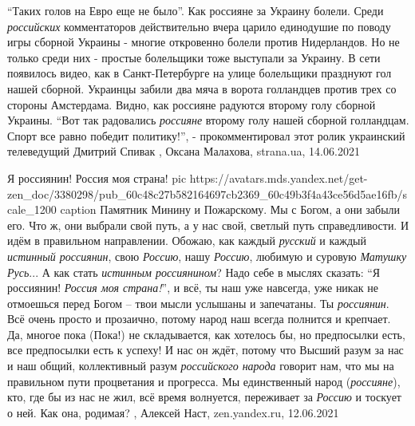 \enquote{Таких голов на Евро еще не было}. Как россияне за Украину болели.
Среди \emph{российских} комментаторов действительно вчера царило единодушие по поводу
игры сборной Украины - многие откровенно болели против Нидерландов.  Но не
только среди них - простые болельщики тоже выступали за Украину.  В сети
появилось видео, как в Санкт-Петербурге на улице болельщики празднуют гол нашей
сборной. Украинцы забили два мяча в ворота голландцев против трех со стороны
Амстердама.  Видно, как россияне радуются второму голу сборной Украины.  \enquote{Вот
так радовались \emph{россияне} второму голу нашей сборной голландцам. Спорт все равно
победит политику!}, - прокомментировал этот ролик украинский телеведущий
Дмитрий Спивак
, 
Оксана Малахова, strana.ua, 14.06.2021

Я россиянин! Россия моя страна!
\ifcmt
  pic https://avatars.mds.yandex.net/get-zen_doc/3380298/pub_60c48c27b582164697cb2369_60c49b3f4a43ce56d5ae16fb/scale_1200
  caption Памятник Минину и Пожарскому.
\fi
Мы с Богом, а они забыли его. Что ж, они выбрали свой путь, а у нас свой,
светлый путь справедливости. И идём в правильном направлении.  Обожаю, как
каждый \emph{русский} и каждый \emph{истинный россиянин}, свою \emph{Россию},
нашу \emph{Россию}, любимую и суровую \emph{Матушку Русь}... А как стать
\emph{истинным россиянином}? Надо себе в мыслях сказать: \enquote{Я россиянин!
\emph{Россия моя страна!}}, и всё, ты наш уже навсегда, уже никак не отмоешься перед
Богом -- твои мысли услышаны и запечатаны. Ты \emph{россиянин}. Всё очень просто и
прозаично, потому народ наш всегда полнится и крепчает.  Да, многое пока
(Пока!) не складывается, как хотелось бы, но предпосылки есть, все предпосылки
есть к успеху! И нас он ждёт, потому что Высший разум за нас и наш общий,
коллективный разум \emph{российского народа} говорит нам, что мы на правильном пути
процветания и прогресса. Мы единственный народ (\emph{россияне}), кто, где бы
из нас не жил, всё время волнуется, переживает за \emph{Россию} и тоскует о
ней. Как она, родимая?
, 
Алексей Наст, zen.yandex.ru, 12.06.2021

